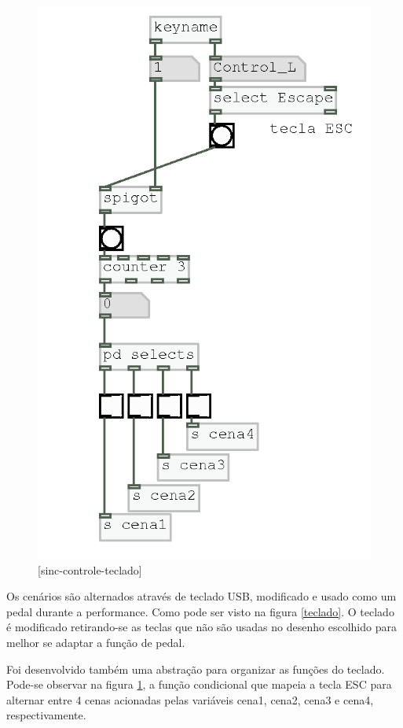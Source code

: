 \documentclass{ppgmus}
\begin{document}
\begin{figure}[-h]
\includegraphics[scale=.4]{sinc-controle-teclado}
\caption{[sinc-controle-teclado]}
\label{sinc-controle-teclado}
\end{figure}

Os cenários são alternados através de teclado USB, modificado e usado como
um pedal durante a performance. Como pode ser visto na figura \ref{teclado}.
O teclado é modificado retirando-se as teclas que não são usadas no desenho escolhido
para melhor se adaptar a função de pedal.

Foi desenvolvido também uma abstração para organizar as funções do teclado.
Pode-se observar na figura \ref{sinc-controle-teclado}, a função condicional
que mapeia a tecla ESC para alternar entre 4 cenas acionadas pelas variáveis
cena1, cena2, cena3 e cena4, respectivamente.
\end{document}
